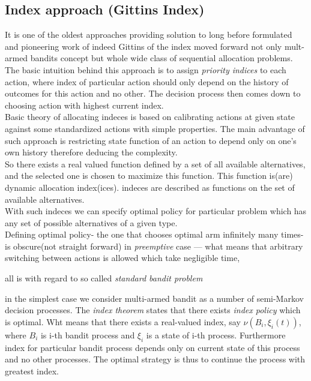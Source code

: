 \documentclass[12pt, a4paper, pdflatex, leqno]{report}
\begin{document}
\subsection{Index approach (Gittins Index)\label{sec:gitind}}
It is one of the oldest approaches providing solution to long before formulated and pioneering work of indeed Gittins of the index moved forward not only mult-armed bandits concept but whole wide class of sequential allocation problems.\\

The basic intuition behind this approach is to assign \emph{priority indices} to each action, where index of particular action should only depend on the history of outcomes for this action and no other. The decision process then comes down to choosing action with highest current index.\\

Basic theory of allocating indeces is based on calibrating actions at given state against some standardized actions with simple properties. The main advantage of such approach is restricting state function of an action to depend only on one's own history therefore deducing the complexity.\\

So there exists a real valued function defined by a set of all available alternatives, and the selected one is chosen to maximize this function. This function is(are) dynamic allocation index(ices). indeces are described as functions on the set of available alternatives.\\
With such indeces we can specify optimal policy for particular problem which has any set of possible alternatives of a given type.\\

Defining optimal policy- the one that chooses optimal arm infinitely many times- is obscure(not straight forward) in \emph{preemptive} case --- what means that arbitrary switching between actions is allowed which take negligible time, 

all is with regard to so called \emph{standard bandit problem}

in the simplest case we consider multi-armed bandit as a number of semi-Markov decision processes. The \emph{index theorem} states that there exists \emph{index policy} which is optimal. Wht means that there exists a real-valued index, say $\nu ( B_i , \xi_i(t) )$, where $B_i$ is i-th bandit process and $\xi_i$ is a state of i-th process. Furthermore index for particular bandit process depends only on current state of this process and no other processes. The optimal strategy is thus to continue the process with greatest index.\\
\end{document}
